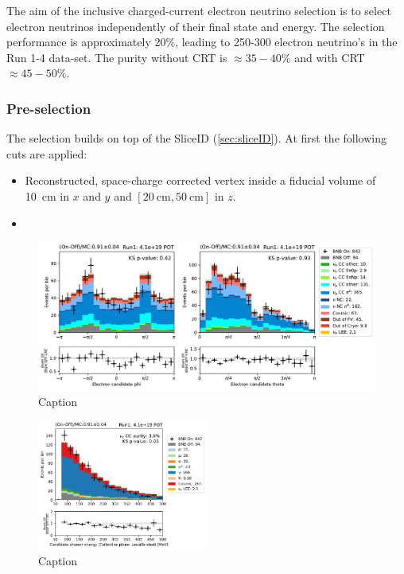 \label{sec:nueselection:inclusive}

The aim of the inclusive charged-current electron neutrino selection is to select electron neutrinos independently of their final state and energy. The selection performance is approximately 20\%, leading to 250-300 electron neutrino's in the Run 1-4 data-set. The purity without CRT is $\approx 35-40\%$ and with CRT $\approx 45-50\%$.

\subsubsection{Pre-selection}
The selection builds on top of the SliceID (\cref{sec:sliceID}). At first the following cuts are applied:
\begin{itemize}
    \item Reconstructed, space-charge corrected vertex inside a fiducial volume of \SI{10}{\cm} in $x$ and $y$ and $[ \SI{20}{\cm}, \SI{50}{\cm}]$ in $z$.
    \item 
\end{itemize}

\begin{figure}
    \centering
    \includegraphics[width=\textwidth]{NueCCsel/Images/run1/pre_angles.pdf}
    \caption{Caption}
    \label{fig:pre_shower_E_pdg}
\end{figure}

\begin{figure}
    \centering
    \includegraphics[width=0.5\textwidth]{NueCCsel/Images/run1/pre_shower_E_pdg.pdf}
    \caption{Caption}
    \label{fig:pre_shower_E_pdg}
\end{figure}

